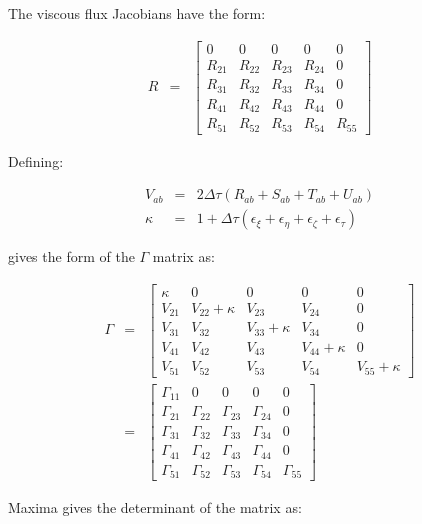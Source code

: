 The viscous flux Jacobians have the form:

\begin{eqnarray}
R
&=&
\left[
\begin{array}{ccccc}
0 & 0 & 0 & 0 & 0 \\
R_{21} & R_{22} & R_{23} & R_{24} & 0 \\
R_{31} & R_{32} & R_{33} & R_{34} & 0 \\
R_{41} & R_{42} & R_{43} & R_{44} & 0 \\
R_{51} & R_{52} & R_{53} & R_{54} & R_{55}
\end{array}
\right]
\nonumber
\end{eqnarray}

Defining:

\begin{eqnarray}
V_{ab} &=& 2 \Delta \tau 
\left(
R_{ab}
+
S_{ab}
+
T_{ab}
+
U_{ab}
\right)
\nonumber
\\
\kappa
&=&
1 + \Delta \tau
\left(
\epsilon_{\xi}
+
\epsilon_{\eta}
+
\epsilon_{\zeta}
+
\epsilon_{\tau}
\right)
\nonumber
\end{eqnarray}

gives the form of the $\Gamma$ matrix as:

\begin{eqnarray}
\Gamma
&=&
\left[
\begin{array}{ccccc}
\kappa & 0 & 0 & 0 & 0 \\
V_{21} & V_{22} + \kappa & V_{23} & V_{24} & 0 \\
V_{31} & V_{32} & V_{33} + \kappa & V_{34} & 0 \\
V_{41} & V_{42} & V_{43} & V_{44} + \kappa & 0 \\
V_{51} & V_{52} & V_{53} & V_{54} & V_{55} + \kappa
\end{array}
\right]
\nonumber
\\
&=&
\left[
\begin{array}{ccccc}
\Gamma_{11} & 0 & 0 & 0 & 0 \\
\Gamma_{21} & \Gamma_{22} & \Gamma_{23} & \Gamma_{24} & 0 \\
\Gamma_{31} & \Gamma_{32} & \Gamma_{33} & \Gamma_{34} & 0 \\
\Gamma_{41} & \Gamma_{42} & \Gamma_{43} & \Gamma_{44} & 0 \\
\Gamma_{51} & \Gamma_{52} & \Gamma_{53} & \Gamma_{54} & \Gamma_{55} 
\end{array}
\right]
\nonumber
\end{eqnarray}

Maxima gives the determinant of the matrix as:

